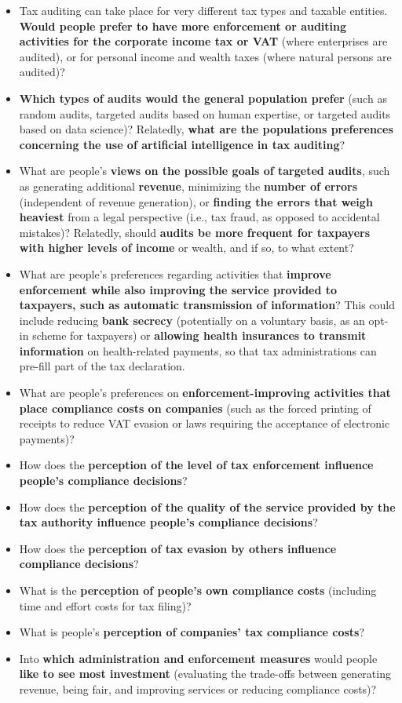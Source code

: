 \documentclass[a4paper, 12pt]{article}
\begin{document}
\begin{itemize}
    \item Tax auditing can take place for very different tax types and taxable entities. \textbf{Would people prefer to have more enforcement or auditing activities for the corporate income tax or VAT} (where enterprises are audited), or for  personal income and wealth taxes (where natural persons are audited)? 
    \item \textbf{Which types of audits would the general population prefer} (such as random audits, targeted audits based on  human expertise, or targeted audits based on data science)? Relatedly, \textbf{what are the populations preferences  concerning the use of artificial intelligence in tax auditing}? 
    \item What are people’s \textbf{views on the possible goals of targeted audits}, such as generating additional \textbf{revenue},  minimizing the \textbf{number of errors} (independent of revenue generation), or \textbf{finding the errors that weigh heaviest} from a legal perspective (i.e., tax fraud, as opposed to accidental mistakes)? Relatedly, should\textbf{ audits be more  frequent for taxpayers with higher levels of income} or wealth, and if so, to what extent?
    \item What are people’s preferences regarding activities that\textbf{ improve enforcement while also improving the service  provided to taxpayers, such as automatic transmission of information}? This could include reducing\textbf{ bank secrecy}  (potentially on a voluntary basis, as an opt-in scheme for taxpayers) or \textbf{allowing health insurances to transmit  information} on health-related payments, so that tax administrations can pre-fill part of the tax declaration.
    \item What are people’s preferences on\textbf{ enforcement-improving activities that place compliance costs on companies}  (such as the forced printing of receipts to reduce VAT evasion or laws requiring the acceptance of electronic  payments)?
    \item How does the \textbf{perception of the level of tax enforcement influence people’s compliance decisions}?
    \item How does the\textbf{ perception of the quality of the service provided by the tax authority influence people’s  compliance decisions}?
    \item How does the \textbf{perception of tax evasion by others influence compliance decisions}?
    \item What is the \textbf{perception of people’s own compliance costs} (including time and effort costs for tax filing)?
    \item What is people’s \textbf{perception of companies’ tax compliance costs}?
    \item Into \textbf{which administration and enforcement measures} would people \textbf{like to see most investment} (evaluating the  trade-offs between generating revenue, being fair, and improving services or reducing compliance costs)?
\end{itemize}
\end{document}
